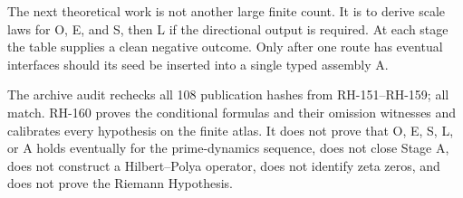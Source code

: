 \documentclass[12pt]{article}
\begin{document}
The next theoretical work is not another large finite count.  It is to derive
scale laws for O, E, and S, then L if the directional output is required.  At
each stage the table supplies a clean negative outcome.  Only after one route
has eventual interfaces should its seed be inserted into a single typed
assembly A.

The archive audit rechecks all 108 publication hashes from RH-151--RH-159;
all match.  RH-160 proves the conditional formulas and their omission
witnesses and calibrates every hypothesis on the finite atlas.  It does not
prove that O, E, S, L, or A holds eventually for the prime-dynamics sequence,
does not close Stage A, does not construct a Hilbert--Polya operator, does not
identify zeta zeros, and does not prove the Riemann Hypothesis.



\end{document}
